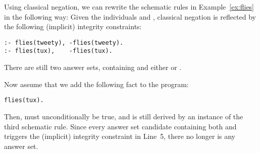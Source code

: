 \begin{example}\label{ex:flies:neg}
Using classical negation,
we can rewrite the schematic rules in Example~\ref{ex:flies}
in the following way:
%
% 
%
Given the individuals  and ,
classical negation is reflected by 
the following (implicit) integrity constraints:%
%
\begin{lstlisting}[firstnumber=4]
:- flies(tweety), -flies(tweety).
:- flies(tux),    -flies(tux).
\end{lstlisting}
There are still two answer sets,
containing  and 
either  or .

Now assume that we add the following fact to the program:
\begin{lstlisting}[numbers=none]
flies(tux).
\end{lstlisting}
Then,
 must unconditionally be true,
and  is still derived by 
an instance of the third schematic rule.
Since every answer set candidate containing
both  and 
triggers
the (implicit) integrity constraint in Line~5,
there no longer is any answer set.
\eexample
\end{example}


